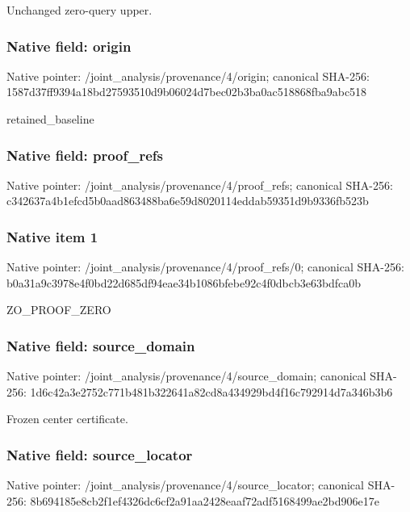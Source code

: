\documentclass[10pt,a4paper]{article}
\begin{document}
\begingroup\raggedright\sloppy Unchanged zero-query upper.\par\endgroup

\subsubsection{Native field: origin}
Native pointer: /joint\_\allowbreak{}analysis/provenance/4/origin; canonical SHA-256: 1587d37ff9394a18bd27593510d9b06024d7bec02b3ba0ac518868fba9abc518

\begingroup\raggedright\sloppy retained\_\allowbreak{}baseline\par\endgroup

\subsubsection{Native field: proof\_\allowbreak{}refs}
Native pointer: /joint\_\allowbreak{}analysis/provenance/4/proof\_\allowbreak{}refs; canonical SHA-256: c342637a4b1efcd5b0aad863488ba6e59d8020114eddab59351d9b9336fb523b

\subsubsection{Native item 1}
Native pointer: /joint\_\allowbreak{}analysis/provenance/4/proof\_\allowbreak{}refs/0; canonical SHA-256: b0a31a9c3978e4f0bd22d685df94eae34b1086bfebe92c4f0dbcb3e63bdfca0b

\begingroup\raggedright\sloppy ZO\_\allowbreak{}PROOF\_\allowbreak{}ZERO\par\endgroup

\subsubsection{Native field: source\_\allowbreak{}domain}
Native pointer: /joint\_\allowbreak{}analysis/provenance/4/source\_\allowbreak{}domain; canonical SHA-256: 1d6c42a3e2752c771b481b322641a82cd8a434929bd4f16c792914d7a346b3b6

\begingroup\raggedright\sloppy Frozen center certificate.\par\endgroup

\subsubsection{Native field: source\_\allowbreak{}locator}
Native pointer: /joint\_\allowbreak{}analysis/provenance/4/source\_\allowbreak{}locator; canonical SHA-256: 8b694185e8cb2f1ef4326dc6cf2a91aa2428eaaf72adf5168499ae2bd906e17e
\end{document}
